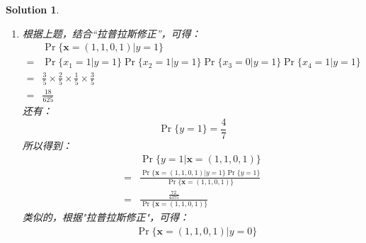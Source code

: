 \documentclass[a4paper,UTF8]{article}
\numberwithin{equation}{section}
\newtheorem*{mySol}{Solution}
\begin{document}
\begin{mySol}
\begin{enumerate}[ {(}1{)}]
综上可得
\begin{equation}
\begin{aligned}
&\Pr\{ y=0 | \mathbf{x}=(1,1,0,1) \}\\ 
=& \frac{\Pr\{\mathbf{x}=(1,1,0,1) | y=0  \} \Pr\{y=0\}}{\Pr\{\mathbf{x}=(1,1,0,1) \}}\\
=& \frac{\frac{1}{40}}{\Pr\{\mathbf{x}=(1,1,0,1)\}}
\end{aligned}
\end{equation}
因为$\Pr\{ y=1 | \mathbf{x}=(1,1,0,1) \} = 0$所以可得
\begin{equation}
\Pr\{ y=0 | \mathbf{x}=(1,1,0,1) \} = 1
\end{equation}
综上可得
\begin{equation}
\begin{aligned}
&\Pr\{ y=1 | \mathbf{x}=(1,1,0,1) \} = 0\\
&\Pr\{ y=0 | \mathbf{x}=(1,1,0,1) \} = \frac{\frac{1}{40}}{\Pr\{\mathbf{x}=(1,1,0,1)\}}
\end{aligned}
\end{equation}
\item 
根据上题，结合“拉普拉斯修正”，可得：
\begin{equation}
\begin{aligned}
&\Pr\{\mathbf{x}=(1,1,0,1) | y=1  \}\\ 
=& \Pr\{x_1 = 1 | y = 1\}\Pr\{x_2 = 1 | y = 1\}\Pr\{x_3 = 0 | y = 1\}\Pr\{x_4 = 1 | y = 1\}\\
=& \frac{3}{5}\times\frac{2}{5}\times\frac{1}{5}\times\frac{3}{5}\\
=& \frac{18}{625}
\end{aligned}
\end{equation}
还有：
\begin{equation}
\Pr\{y=1\} = \frac{4}{7}
\end{equation}
所以得到：
\begin{equation}
\begin{aligned}
&\Pr\{ y=1 | \mathbf{x}=(1,1,0,1) \}\\ 
=& \frac{\Pr\{\mathbf{x}=(1,1,0,1) | y=1  \} \Pr\{y=1\}}{\Pr\{\mathbf{x}=(1,1,0,1) \}}\\
=& \frac{\frac{72}{4375}}{\Pr\{\mathbf{x}=(1,1,0,1)\}}
\end{aligned}
\end{equation}
类似的，根据"拉普拉斯修正"，可得：
\begin{equation}
\begin{aligned}
&\Pr\{\mathbf{x}=(1,1,0,1) | y=0  \}\\ 

\end{aligned}
\end{equation}
\end{enumerate}
\end{mySol}
\end{document}

